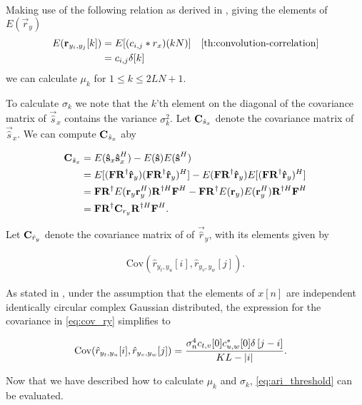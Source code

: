 \documentclass[a4paper, openany, oneside]{memoir}
\begin{document}
Making use of the following relation as derived in \cite{ariananda2012compressive}, giving  the elements of $E(\vec{r}_y)$ 
\begin{align*}
E(\vec{r}_{y_i, y_j}[k]) &= E[(c_{i,j} \ast r_x) (kN)] & \text{\cref{th:convolution-correlation}} \\
&=  c_{i,j} \delta[k]
\end{align*}
we can calculate $\mu_k$ for $1 \leq k \leq 2LN+1$.

To calculate $\sigma_k$ we note that the $k$'th element on the diagonal of the covariance matrix of $\vec{\hat{s}}_x$ contains the variance $\sigma_k^2$. Let $\boldsymbol{\mathbf{C}}_{\hat{s}_x}$ denote the covariance matrix of $\vec{\hat{s}}_x$.  We can compute $\boldsymbol{\mathbf{C}}_{\hat{s}_x}$ aby

\begin{align*}
\boldsymbol{\mathbf{C}}_{\hat{s}_x} &= E(\boldsymbol{\mathbf{\hat{s}}}_x\boldsymbol{\mathbf{\hat{s}}}_x^H) - E(\boldsymbol{\mathbf{\hat{s}}})E(\boldsymbol{\mathbf{\hat{s}}}^H) \\
&= E[(\boldsymbol{\mathbf{F}} \boldsymbol{\mathbf{R}}^{\dagger}\boldsymbol{\mathbf{\hat{r}}}_y) ( \boldsymbol{\mathbf{F}}\boldsymbol{\mathbf{R}}^{\dagger}\boldsymbol{\mathbf{\hat{r}}}_y)^H] - E(\boldsymbol{\mathbf{F}}\boldsymbol{\mathbf{R}}^{\dagger}\boldsymbol{\mathbf{\hat{r}}}_y)E[(\boldsymbol{\mathbf{F}}\boldsymbol{\mathbf{R}}^{\dagger}\boldsymbol{\mathbf{\hat{r}}}_y)^H] \\
&= \boldsymbol{\mathbf{F}}\boldsymbol{\mathbf{R}}^{\dagger} E(\boldsymbol{\mathbf{r}}_y\boldsymbol{\mathbf{r}}_y^H)  \boldsymbol{\mathbf{R}}^{\dagger H}\boldsymbol{\mathbf{F}}^H -  \boldsymbol{\mathbf{F}}\boldsymbol{\mathbf{R}}^{\dagger} E( \boldsymbol{\mathbf{r}}_y) E(\boldsymbol{\mathbf{r}}_y^H)  \boldsymbol{\mathbf{R}}^{\dagger H}\boldsymbol{\mathbf{F}}^H \\
&= \boldsymbol{\mathbf{F}}\boldsymbol{\mathbf{R}}^{\dagger} \boldsymbol{\mathbf{C}}_{r_y} \boldsymbol{\mathbf{R}}^{\dagger H}\boldsymbol{\mathbf{F}}^H.
\end{align*}

Let $\boldsymbol{\mathbf{C}}_{\hat{r}_y}$ denote the covariance matrix of of $\vec{\hat{r}}_y$, with its elements given by

\begin{align}\label{eq:cov_ry}
\text{Cov}(\hat{r}_{y_t,y_u}[i],\hat{r}_{y_v, y_w}[j]).
\end{align}

As stated in \cite{ariananda2012compressive}, under the assumption that the elements of $x[n]$ are independent identically circular complex Gaussian distributed, the expression for the covariance in \cref{eq:cov_ry} simplifies to

\begin{align}\label{eq:elem_cov_ry}
\text{Cov}(\hat{r}_{y_t,y_u}[i],\hat{r}_{y_v, y_w}[j]) &= \frac{\sigma_n^4 c_{t,v}[0] c^*_{u,w}[0] \delta \left[ j-i\right]}{KL-|i|}.
\end{align}

Now that we have described how to calculate $\mu_k$ and $\sigma_k$, \cref{eq:ari_threshold} can be evaluated.
\end{document}
